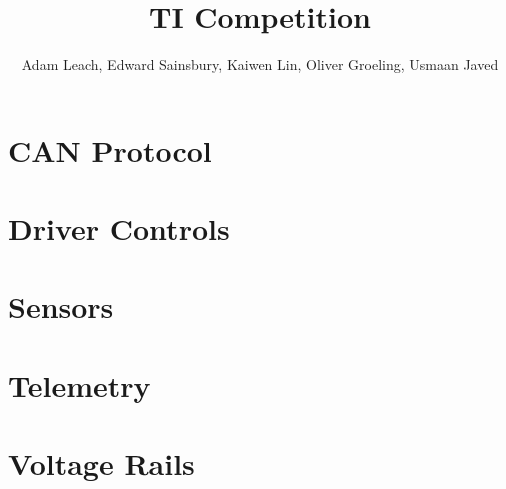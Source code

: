 \documentclass[10pt,a4paper]{article}
\begin{document}
\title{TI Competition}
\author{Adam Leach, Edward Sainsbury, Kaiwen Lin, Oliver Groeling, Usmaan Javed}
\maketitle
\tableofcontents
\section{CAN Protocol}

\section{Driver Controls}

\section{Sensors}

\section{Telemetry}

\section{Voltage Rails}

\end{document}
